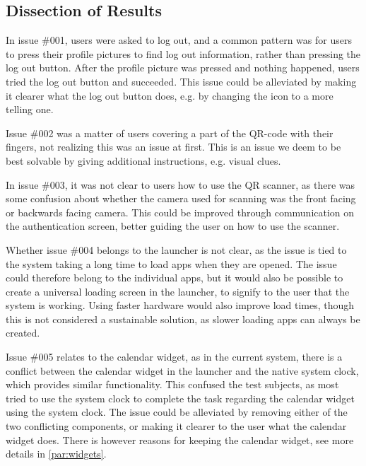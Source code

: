 \subsection*{Dissection of Results}
In issue \#{}001, users were asked to log out, and a common pattern was for users to press their profile pictures to find log out information, rather than pressing the log out button. 
After the profile picture was pressed and nothing happened, users tried the log out button and succeeded. 
This issue could be alleviated by making it clearer what the log out button does, e.g. by changing the icon to a more telling one.\newline

Issue \#{}002 was a matter of users covering a part of the QR-code with their fingers, not realizing this was an issue at first. 
This is an issue we deem to be best solvable by giving additional instructions, e.g. visual clues. \newline

In issue \#{}003, it was not clear to users how to use the QR scanner, as there was some confusion about whether the camera used for scanning was the front facing or backwards facing camera. 
This could be improved through communication on the authentication screen, better guiding the user on how to use the scanner. \newline

Whether issue \#{}004 belongs to the launcher is not clear, as the issue is tied to the system taking a long time to load apps when they are opened. 
The issue could therefore belong to the individual apps, but it would also be possible to create a universal loading screen in the launcher, to signify to the user that the system is working. 
Using faster hardware would also improve load times, though this is not considered a sustainable solution, as slower loading apps can always be created. \newline

Issue \#{}005 relates to the calendar widget, as in the current system, there is a conflict between the calendar widget in the \giraf[] launcher and the native system clock, which provides similar functionality. 
This confused the test subjects, as most tried to use the system clock to complete the task regarding the calendar widget using the system clock. 
The issue could be alleviated by removing either of the two conflicting components, or making it clearer to the user what the calendar widget does. 
There is however reasons for keeping the calendar widget, see more details in \autoref{par:widgets}. \newline

